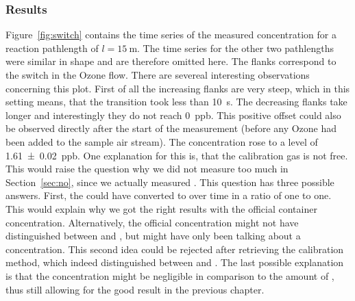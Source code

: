 \subsubsection{Results}
\label{sec:switch-results}

Figure~\ref{fig:switch} contains the time series of the measured
 concentration for a reaction pathlength of $l =
\SI{15}{\meter}$. The time series for the other two pathlengths were
similar in shape and are therefore omitted here. The flanks correspond
to the switch in the Ozone flow. There are severeal interesting
observations concerning this plot. First of all the increasing flanks
are very steep, which in this setting means, that the transition took
less than \SI{10}{\second}. The decreasing flanks take longer and
interestingly they do not reach \SI{0}{ppb}. This positive offset
could also be observed directly after the start of the measurement
(before any Ozone had been added to the 
sample air stream). The concentration rose to a level of
\SI{1.61(2)}{ppb}. One explanation for this is, that the calibration gas is
not  free. This would raise the question why we did not
measure too much  in Section~\ref{sec:no}, since we actually
measured . This question has three possible answers. First, the
 could have converted to  over time in a ratio of
one to one. This would explain why we got the right results with the official
container concentration. Alternatively, the official concentration
might not have distinguished between  and , but might
have only been talking about a  concentration. This second
idea could be rejected after retrieving the calibration method, which
indeed distinguished between  and . The last possible
explanation is that the  concentration might be negligible in
comparison to the amount of , thus still allowing for the good
result in the previous chapter.

